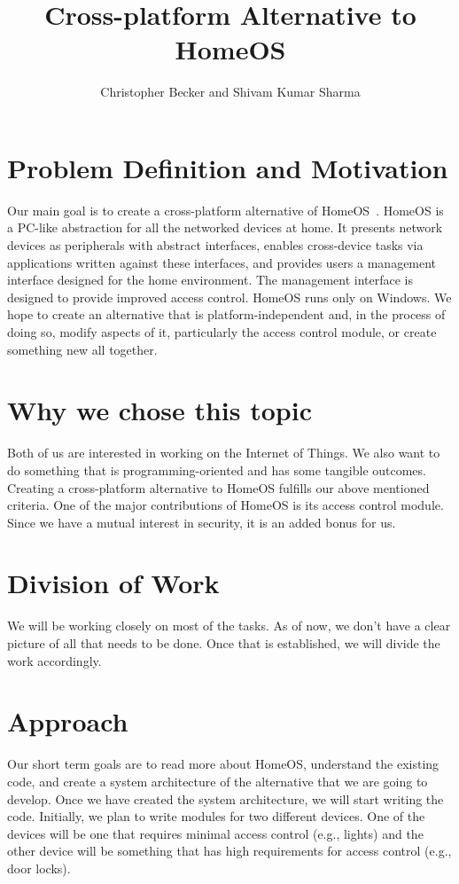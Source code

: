 \documentclass[letterpaper,12pt]{article}
\title{Cross-platform Alternative to HomeOS}
\author{Christopher Becker and Shivam Kumar Sharma}
\begin{document}
\maketitle

\section{Problem Definition and Motivation}
Our main goal is to create a cross-platform alternative of HomeOS~\cite{homeOS}. HomeOS is a PC-like abstraction for all the networked devices at home. It presents network devices as peripherals with abstract interfaces, enables cross-device tasks via applications written against these interfaces, and provides users a management interface designed for the home environment. The management interface is designed to provide improved access control. HomeOS runs only on Windows. We hope to create an alternative that is platform-independent and, in the process of doing so, modify aspects of it, particularly the access control module, or create something new all together.

\section{Why we chose this topic}
Both of us are interested in working on the Internet of Things. We also want to do something that is programming-oriented and has some tangible outcomes. Creating a cross-platform alternative to HomeOS fulfills our above mentioned criteria. One of the major contributions of HomeOS is its access control module. Since we have a mutual interest in security, it is an added bonus for us.

\section{Division of Work}
We will be working closely on most of the tasks. As of now, we don't have a clear picture of all that needs to be done. Once that is established, we will divide the work accordingly.

\section{Approach}
Our short term goals are to read more about HomeOS, understand the existing code, and create a system architecture of the alternative that we are going to develop. Once we have created the system architecture, we will start writing the code. Initially, we plan to write modules for two different devices. One of the devices will be one that requires minimal access control (e.g., lights) and the other device will be something that has high requirements for access control (e.g., door locks).
\end{document}
